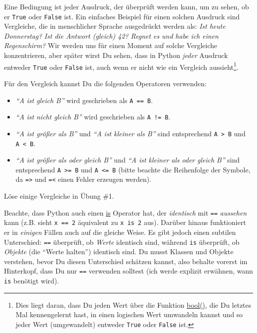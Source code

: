 \documentclass[
]{book}
\providecommand{\tightlist}{%
  \setlength{\itemsep}{0pt}\setlength{\parskip}{0pt}}
\begin{document}
Eine Bedingung ist jeder Ausdruck, der überprüft werden kann, um zu sehen, ob er \texttt{True} oder \texttt{False} ist. Ein einfaches Beispiel für einen solchen Ausdruck sind Vergleiche, die in menschlicher Sprache ausgedrückt werden als: \emph{Ist heute Donnerstag?} \emph{Ist die Antwort (gleich) 42?} \emph{Regnet es und habe ich einen Regenschirm?} Wir werden uns für einen Moment auf solche Vergleiche konzentrieren, aber später wirst Du sehen, dass in Python \emph{jeder} Ausdruck entweder \texttt{True} oder \texttt{False} ist, auch wenn er nicht wie ein Vergleich aussieht\footnote{Dies liegt daran, dass Du jeden Wert über die Funktion \href{https://docs.python.org/3/library/functions.html\#bool}{bool()}, die Du letztes Mal kennengelernt hast, in einen logischen Wert umwandeln kannst und so jeder Wert (umgewandelt) entweder \texttt{True} oder \texttt{False} ist.}.

Für den Vergleich kannst Du die folgenden Operatoren verwenden:

\begin{itemize}
\tightlist
\item
  \emph{``A ist gleich B''} wird geschrieben als \texttt{A\ ==\ B}.
\item
  \emph{``A ist nicht gleich B''} wird geschrieben als \texttt{A\ !=\ B}.
\item
  \emph{``A ist größer als B''} und \emph{``A ist kleiner als B''} sind entsprechend \texttt{A\ \textgreater{}\ B} und \texttt{A\ \textless{}\ B}.
\item
  \emph{``A ist größer als oder gleich B''} und \emph{``A ist kleiner als oder gleich B''} sind entsprechend \texttt{A\ \textgreater{}=\ B} und \texttt{A\ \textless{}=\ B} (bitte beachte die Reihenfolge der Symbole, da \texttt{=\textgreater{}} und \texttt{=\textless{}} einen Fehler erzeugen werden).
\end{itemize}

Löse einige Vergleiche in Übung \#1.

Beachte, dass Python auch einen \href{https://docs.python.org/3/library/operator.html\#operator.is_}{is} Operator hat, der \emph{identisch} mit \texttt{==} \emph{aussehen} kann (z.B. sieht \texttt{x\ ==\ 2} äquivalent zu \texttt{x\ is\ 2} aus). Darüber hinaus funktioniert er in \emph{einigen} Fällen auch auf die gleiche Weise. Es gibt jedoch einen subtilen Unterschied: \texttt{==} überprüft, ob \emph{Werte} identisch sind, während \texttt{is} überprüft, ob \emph{Objekte} (die ``Werte halten'') identisch sind. Du musst Klassen und Objekte verstehen, bevor Du diesen Unterschied schätzen kannst, also behalte vorerst im Hinterkopf, dass Du nur \texttt{==} verwenden solltest (ich werde explizit erwähnen, wann \texttt{is} benötigt wird).
\end{document}
